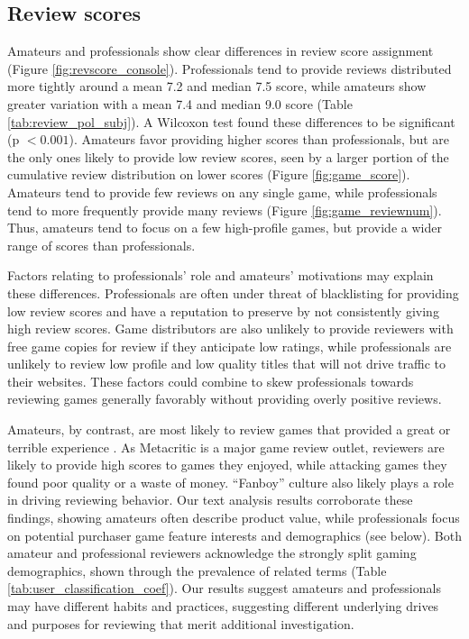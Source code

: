 \documentclass{sig-alternate}
\begin{document}
\subsection{Review scores}
Amateurs and professionals show clear differences in review score assignment (Figure \ref{fig:revscore_console}). Professionals tend to provide reviews distributed more tightly around a mean 7.2 and median 7.5 score, while amateurs show greater variation with a mean 7.4 and median 9.0 score (Table \ref{tab:review_pol_subj}). A Wilcoxon test found these differences to be significant (p $< 0.001$). Amateurs favor providing higher scores than professionals, but are the only ones likely to provide low review scores, seen by a larger portion of the cumulative review distribution on lower scores (Figure \ref{fig:game_score}). Amateurs tend to provide few reviews on any single game, while professionals tend to more frequently provide many reviews (Figure \ref{fig:game_reviewnum}). Thus, amateurs tend to focus on a few high-profile games, but provide a wider range of scores than professionals. 

Factors relating to professionals' role and amateurs' motivations may
explain these differences. Professionals are often under threat of
blacklisting for providing low review scores and have a reputation to
preserve by not consistently giving high review scores. Game
distributors are also unlikely to provide reviewers with free game
copies for review if they anticipate low ratings, while professionals
are unlikely to review low profile and low quality titles that will not
drive traffic to their websites. These factors could combine to skew professionals towards reviewing games generally favorably without providing overly positive reviews.

Amateurs, by contrast, are most likely to review games that provided a great or terrible experience \cite{gilbert2010deja}. As Metacritic is a major game review outlet, reviewers are likely to provide high scores to games they enjoyed, while attacking games they found poor quality or a waste of money. ``Fanboy'' culture also likely plays a role in driving reviewing behavior. Our text analysis results corroborate these findings, showing amateurs often describe product value, while professionals focus on potential purchaser game feature interests and demographics (see below). Both amateur and professional reviewers acknowledge the strongly split gaming demographics, shown through the prevalence of related terms (Table \ref{tab:user_classification_coef}). 
Our results suggest amateurs and professionals may have different habits and practices, suggesting different underlying drives and purposes for reviewing that merit additional investigation.
\end{document}
